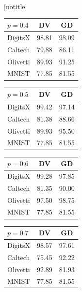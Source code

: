 \documentclass[final,hyperref={pdfpagelabels=false},notheorems]{beamer}
\newcommand{\shrink}{-15pt}
\theoremstyle{thesisstyle}
\begin{document}
\begin{frame}[t]
\begin{columns}[t]
  \begin{column}{.5225\textwidth}

    \vspace{\shrink}
    [notitle]
    \begin{block}{}
      \begin{table}[h]
        \begin{tabular}{l|c|c}
          $p=0.4$ & DV & GD\\
          \hline
          DigitsX & 98.81 & 98.09\\
          Caltech & 79.88 & 86.11\\
          Olivetti& 89.93 & 91.25\\
          MNIST   & 77.85 & 81.55\\
        \end{tabular}\hspace{2.5cm}
        \begin{tabular}{l|c|c}
          $p=0.5$ & DV & GD\\
          \hline
          DigitsX & 99.42 & 97.14\\
          Caltech & 81.38 & 88.66\\
          Olivetti& 89.93 & 95.50\\
          MNIST   & 77.85 & 81.55\\
        \end{tabular}\hspace{2.5cm}
        \begin{tabular}{l|c|c}
          $p=0.6$ & DV & GD\\
          \hline
          DigitsX & 99.28 & 97.85\\
          Caltech & 81.35 & 90.00\\
          Olivetti& 97.50 & 98.75\\
          MNIST   & 77.85 & 81.55\\
        \end{tabular}
        \begin{tabular}{l|c|c}
          $p=0.7$ & DV & GD\\
          \hline
          DigitsX & 98.57 & 97.61\\
          Caltech & 75.45 & 92.22\\
          Olivetti& 92.89 & 81.93\\
          MNIST   & 77.85 & 81.55\\
        \end{tabular}\hspace{2.5cm}

\end{table}
\end{block}
\end{column}
\end{columns}
\end{frame}
\end{document}
